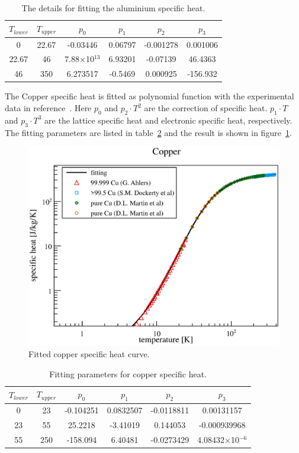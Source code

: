 \begin{table}[H]
 \centering
 \begin{tabular}{cccccc} \hline \hline
 $T_{lower}$ & $T_{upper}$ & $p_0$ & $p_1$ & $p_2$ & $p_3$ \\ \hline
 0 & 22.67 & -0.03446 & 0.06797 & -0.001278 & 0.001006 \\
 22.67 & 46 & 7.88$\times$10$^{13}$ & 6.93201 & -0.07139 & 46.4363 \\
 46 & 350 & 6.273517 & -0.5469 & 0.000925 & -156.932 \\ \hline \hline
 \end{tabular}
 \caption{The details for fitting the aluminium specific heat.}
 \label{4alsh}
\end{table}

The Copper specific heat is fitted as polynomial function with the experimental data in reference~\cite{aldata}.
Here $p_0$ and $p_2 \cdot T^2$ are the correction of specific heat.
$p_1 \cdot T$ and $p_3 \cdot T^3$ are the lattice specific heat and electronic specific heat, respectively.
The fitting parameters are listed in table~\ref{cufit} and the result is shown in figure~\ref{4cush}.
\begin{figure}[H]
   \centering
   \includegraphics[scale=0.47]{chapter5/fig/cush.eps}
   \caption{ Fitted copper specific heat curve.}
   \label{4cush}
  \end{figure}
\begin{table}[H]
 \centering
 \begin{tabular}{cccccc} \hline \hline
  $T_{lower}$ & $T_{upper}$ & $p_0$ & $p_1$ & $p_2$ & $p_3$ \\ \hline
  0 & 23 & -0.104251 & 0.0832507 & -0.0118811 & 0.00131157 \\
  23 & 55 & 25.2218 & -3.41019 & 0.144053 & -0.000939968 \\
  55 & 250 & -158.094 & 6.40481 & -0.0273429 & 4.08432$\times$10$^{-6}$ \\ \hline \hline
 \end{tabular}
 \caption{Fitting parameters for copper specific heat.}
 \label{cufit}
\end{table}
